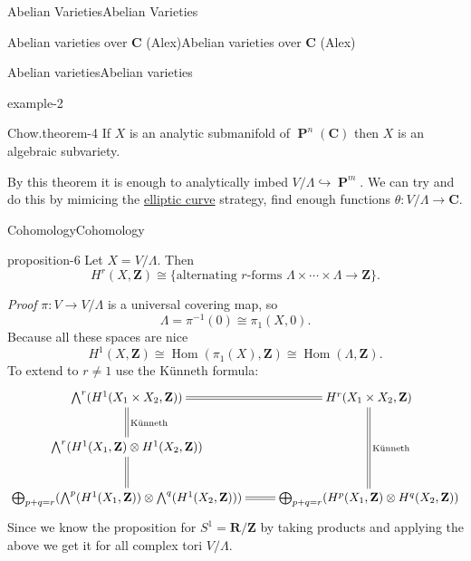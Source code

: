 \documentclass[10pt,]{book}
\makeatletter
\renewcommand*{\proofname}{Proof}
\renewenvironment{proof}[1][\proofname]{\par
  \pushQED{\qed}%
  \normalfont \topsep6\p@\@plus6\p@\relax
  \trivlist
  \item\relax
    {\itshape
    #1\@addpunct{.}}\hspace\labelsep\ignorespaces
}{%
  \popQED\endtrivlist\@endpefalse
}
\numberwithin{equation}{section}
\newcommand{\ZZ}{\mathbf{Z}}
\newcommand{\RR}{\mathbf{R}}
\newcommand{\CC}{\mathbf{C}}
\DeclareMathOperator{\Hom}{Hom}
\DeclareMathOperator{\PP}{\mathbf{P}}
\makeatother
\begin{document}
\begin{chapterptx}{Abelian Varieties}{}{Abelian Varieties}{}{}
\begin{sectionptx}{Abelian varieties over \(\CC\) (Alex)}{}{Abelian varieties over \(\CC\) (Alex)}{}{}
\begin{subsectionptx}{Abelian varieties}{}{Abelian varieties}{}{}
\begin{example}{}{example-2}
\begin{itemize}[label=\textbullet]
\end{itemize}
%
\end{example}
\begin{theorem}{Chow.}{}{theorem-4}%
\hypertarget{p-52}{}%
If \(X\) is an analytic submanifold of \(\PP^n(\CC)\) then \(X\) is an algebraic subvariety.%
\end{theorem}
\hypertarget{p-53}{}%
By this theorem it is enough to analytically imbed \(V/\Lambda \hookrightarrow \PP^m\). We can try and do this by mimicing the \hyperref[def-supersing-isog-ec]{elliptic curve} strategy, find enough functions \(\theta \colon V/\Lambda \to \CC\).%
\end{subsectionptx}
%
%
\typeout{************************************************}
\typeout{************************************************}
%
\begin{subsectionptx}{Cohomology}{}{Cohomology}{}{}\label{subsection-5}
\begin{proposition}{}{}{proposition-6}%
\hypertarget{p-54}{}%
Let \(X = V/\Lambda\). Then%
\begin{equation*}
H^r (X,\ZZ) \cong \{\text{alternating }r\text{-forms } \Lambda\times\cdots\times\Lambda\to \ZZ\}\text{.}
\end{equation*}
%
\end{proposition}
\begin{proof}\hypertarget{proof-10}{}
\hypertarget{p-55}{}%
\(\pi\colon V\to V/\Lambda\) is a universal covering map, so%
\begin{equation*}
\Lambda = \pi^{-1} (0 ) \cong \pi_1(X,0)\text{.}
\end{equation*}
Because all these spaces are nice%
\begin{equation*}
H^1 (X,\ZZ) \cong \Hom(\pi_1(X), \ZZ) \cong \Hom(\Lambda, \ZZ)\text{.}
\end{equation*}
To extend to \(r \ne 1\) use the Künneth formula:%
\begin{equation*}
\xymatrix{
\bigwedge^r(H^1(X_1\times X_2, \ZZ)) \ar@{=}[r]\ar@{=}[d]^{\text{Künneth}} & H^r(X_1\times X_2 , \ZZ)\ar@{=}[dd]^{\text{Künneth}}\\
\bigwedge^r(H^1(X_1, \ZZ)\otimes H^1(X_2, \ZZ)) \ar@{=}[d]& \\
\bigoplus_{p+q=r}(\bigwedge^p(H^1(X_1, \ZZ))\otimes\bigwedge^q(H^1(X_2, \ZZ))) \ar@{=}[r] & \bigoplus_{p+q=r}(H^p(X_1, \ZZ)\otimes H^q(X_2, \ZZ))
}
\end{equation*}
Since we know the proposition for \(S^1 = \RR/\ZZ\) by taking products and applying the above we get it for all complex tori \(V/\Lambda\).%

\end{proof}
\end{subsectionptx}
\end{sectionptx}
\end{chapterptx}
\end{document}
